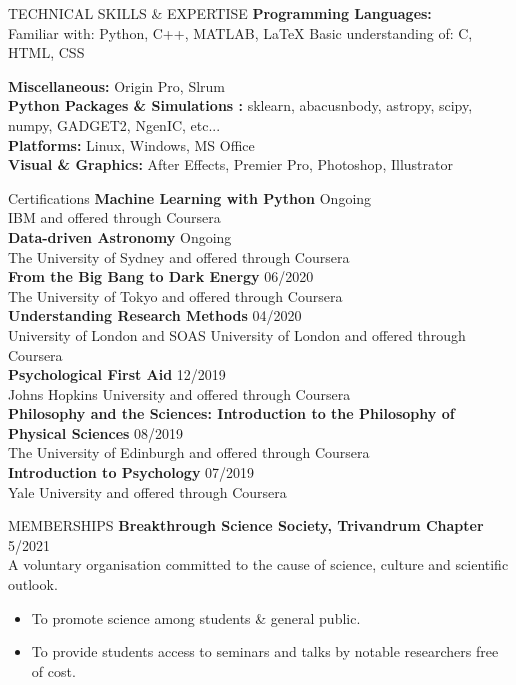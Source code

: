 \documentclass{resume} %
\begin{document}
\begin{rSection}{TECHNICAL SKILLS \& EXPERTISE}{}
	\textbf {Programming Languages:}\\ 
	Familiar with: Python, C++, MATLAB, LaTeX \textbar{} Basic understanding of: C, HTML, CSS  
	
	\item \textbf {Miscellaneous:} Origin Pro, Slrum \\
	\textbf { Python Packages \& Simulations :} sklearn, abacusnbody, astropy, scipy, numpy, GADGET2, NgenIC, etc... \\
	\textbf { Platforms:} Linux, Windows, MS Office \\ 
	\textbf { Visual \& Graphics:} After Effects, Premier Pro, Photoshop, Illustrator 
\end{rSection}

\begin{rSection}{Certifications}
\textbf{Machine Learning with Python }\hfill Ongoing\\
IBM and offered through Coursera \\
\textbf{Data-driven Astronomy }\hfill Ongoing\\
The University of Sydney and offered through Coursera \\
\textbf{From the Big Bang to Dark Energy }\hfill 06/2020\\
The University of Tokyo and offered through Coursera \\
\textbf{Understanding Research Methods }\hfill 04/2020\\
University of London and SOAS University of London and offered through Coursera  \\
\textbf{Psychological First Aid} \hfill 12/2019\\
Johns Hopkins University and offered through Coursera \\
\textbf{Philosophy and the Sciences: Introduction to the Philosophy of Physical Sciences } \hfill 08/2019\\
The University of Edinburgh and offered through Coursera  \\
\textbf{Introduction to Psychology }\hfill 07/2019\\
Yale University and offered through Coursera 
\end{rSection}


\begin{rSection}{MEMBERSHIPS}
\textbf{Breakthrough Science Society, Trivandrum Chapter} \hfill 5/2021
\\ A voluntary organisation committed to the cause of science, culture and scientific outlook.
\begin{itemize}[noitemsep,topsep=-0.2cm]
	\itemsep-0.05cm
	\item To promote science among students \& general public.
	\item To provide students access to seminars and talks by notable researchers free of cost.
\end{itemize}
\end{rSection}
\end{document}
